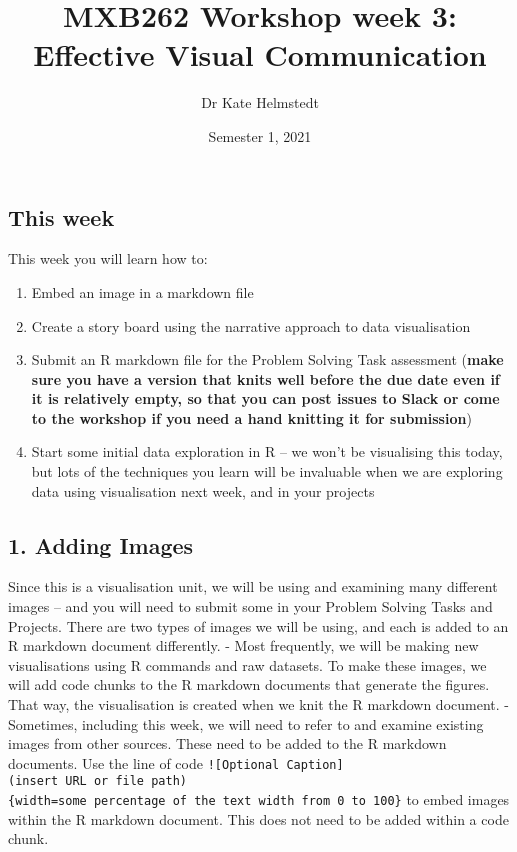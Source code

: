 \documentclass[]{article}
\title{MXB262 Workshop week 3: Effective Visual Communication}
\author{Dr Kate Helmstedt}
\date{Semester 1, 2021}
\providecommand{\tightlist}{%
  \setlength{\itemsep}{0pt}\setlength{\parskip}{0pt}}
\begin{document}
\maketitle

\subsection{This week}\label{this-week}

This week you will learn how to:

\begin{enumerate}
\def\labelenumi{\arabic{enumi}.}
\tightlist
\item
  Embed an image in a markdown file\\
\item
  Create a story board using the narrative approach to data
  visualisation\\
\item
  Submit an R markdown file for the Problem Solving Task assessment
  (\textbf{make sure you have a version that knits well before the due
  date even if it is relatively empty, so that you can post issues to
  Slack or come to the workshop if you need a hand knitting it for
  submission})
\item
  Start some initial data exploration in R -- we won't be visualising
  this today, but lots of the techniques you learn will be invaluable
  when we are exploring data using visualisation next week, and in your
  projects
\end{enumerate}

\subsection{1. Adding Images}\label{adding-images}

Since this is a visualisation unit, we will be using and examining many
different images -- and you will need to submit some in your Problem
Solving Tasks and Projects. There are two types of images we will be
using, and each is added to an R markdown document differently. - Most
frequently, we will be making new visualisations using R commands and
raw datasets. To make these images, we will add code chunks to the R
markdown documents that generate the figures. That way, the
visualisation is created when we knit the R markdown document. -
Sometimes, including this week, we will need to refer to and examine
existing images from other sources. These need to be added to the R
markdown documents. Use the line of code
\texttt{!{[}Optional\ Caption{]}(insert\ URL\ or\ file\ path)\{width=some\ percentage\ of\ the\ text\ width\ from\ 0\ to\ 100\}}
to embed images within the R markdown document. This does not need to be
added within a code chunk.
\end{document}
